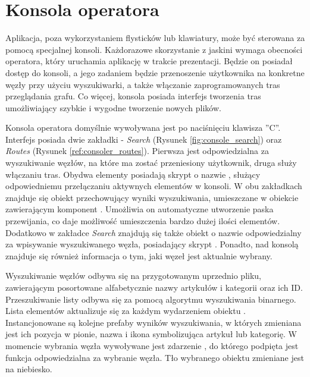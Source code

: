 \section{Konsola operatora}
Aplikacja, poza wykorzystaniem flysticków lub klawiatury, może być sterowana za pomocą specjalnej konsoli. Każdorazowe skorzystanie z jaskini wymaga obecności operatora, który uruchamia aplikację w trakcie prezentacji. Będzie on posiadał dostęp do konsoli, a jego zadaniem będzie przenoszenie użytkownika na konkretne węzły przy użyciu wyszukiwarki, a także włączanie zaprogramowanych tras przeglądania grafu. Co więcej, konsola posiada interfejs tworzenia tras umożliwiający szybkie i wygodne tworzenie nowych plików. 

Konsola operatora domyślnie wywoływana jest po naciśnięciu klawisza ''C''. Interfejs posiada dwie zakładki - \textit{Search} (Rysunek \ref{fig:console_search}) oraz \textit{Routes} (Rysunek \ref{ref:consoler_routes}). Pierwsza jest odpowiedzialna za wyszukiwanie węzłów, na które ma zostać przeniesiony użytkownik, druga służy włączaniu tras. Obydwa elementy posiadają skrypt o nazwie , służący odpowiedniemu przełączaniu aktywnych elementów w konsoli. W obu zakładkach znajduje się obiekt przechowujący wyniki wyszukiwania, umieszczane w obiekcie zawierającym komponent  . Umożliwia on automatyczne utworzenie paska przewijania, co daje możliwość umieszczenia bardzo dużej ilości elementów.  Dodatkowo w zakładce \textit{Search} znajdują się także obiekt o nazwie   odpowiedzialny za wpisywanie wyszukiwanego węzła, posiadający skrypt  . Ponadto, nad konsolą znajduje się również informacja o tym, jaki węzeł jest aktualnie wybrany.


Wyszukiwanie węzłów odbywa się na przygotowanym uprzednio pliku, zawierającym posortowane alfabetycznie nazwy artykułów i kategorii oraz ich ID. Przeszukiwanie listy odbywa się za pomocą algorytmu wyszukiwania binarnego. Lista elementów aktualizuje się za każdym wydarzeniem   obiektu  . Instancjonowane są kolejne prefaby wyników wyszukiwania, w których zmieniana jest ich pozycja w pionie, nazwa i ikona symbolizująca artykuł lub kategorię. W momencie wybrania węzła wywoływane jest zdarzenie  , do którego podpięta jest funkcja   odpowiedzialna za wybranie węzła. Tło wybranego obiektu zmieniane jest na niebiesko.

